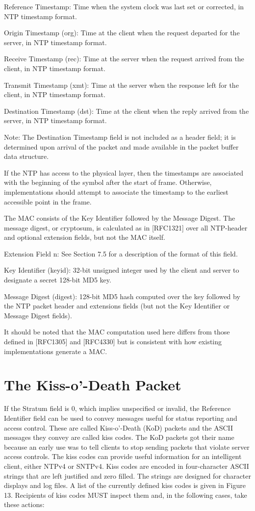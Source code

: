 Reference Timestamp: Time when the system clock was last set or
corrected, in NTP timestamp format.

Origin Timestamp (org): Time at the client when the request departed
for the server, in NTP timestamp format.

Receive Timestamp (rec): Time at the server when the request arrived
from the client, in NTP timestamp format.

Transmit Timestamp (xmt): Time at the server when the response left
for the client, in NTP timestamp format.

Destination Timestamp (dst): Time at the client when the reply
arrived from the server, in NTP timestamp format.

Note: The Destination Timestamp field is not included as a header
field; it is determined upon arrival of the packet and made available
in the packet buffer data structure.

If the NTP has access to the physical layer, then the timestamps are
associated with the beginning of the symbol after the start of frame.
Otherwise, implementations should attempt to associate the timestamp
to the earliest accessible point in the frame.

The MAC consists of the Key Identifier followed by the Message
Digest. The message digest, or cryptosum, is calculated as in
[RFC1321] over all NTP-header and optional extension fields, but not
the MAC itself.

Extension Field n: See Section 7.5 for a description of the format of
this field.

Key Identifier (keyid): 32-bit unsigned integer used by the client
and server to designate a secret 128-bit MD5 key.

Message Digest (digest): 128-bit MD5 hash computed over the key
followed by the NTP packet header and extensions fields (but not the
Key Identifier or Message Digest fields).

It should be noted that the MAC computation used here differs from
those defined in [RFC1305] and [RFC4330] but is consistent with how
existing implementations generate a MAC.

\section{The Kiss-o’-Death Packet}

If the Stratum field is 0, which implies unspecified or invalid, the
Reference Identifier field can be used to convey messages useful for
status reporting and access control. These are called Kiss-o’-Death
(KoD) packets and the ASCII messages they convey are called kiss
codes. The KoD packets got their name because an early use was to
tell clients to stop sending packets that violate server access
controls. The kiss codes can provide useful information for an
intelligent client, either NTPv4 or SNTPv4. Kiss codes are encoded
in four-character ASCII strings that are left justified and zero
filled. The strings are designed for character displays and log
files. A list of the currently defined kiss codes is given in
Figure 13. Recipients of kiss codes MUST inspect them and, in the
following cases, take these actions:

